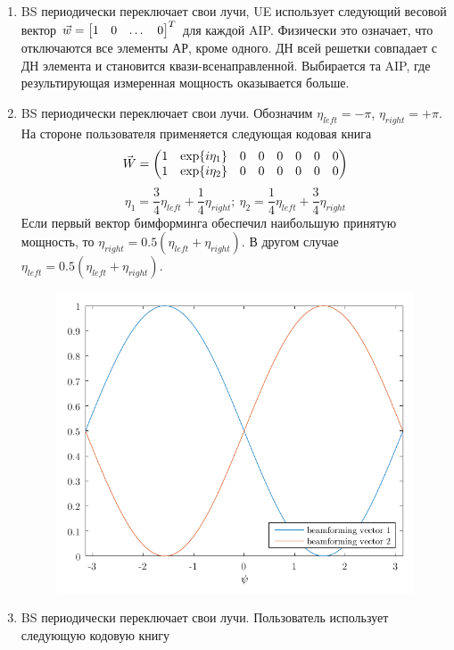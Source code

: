 \begin{enumerate}[label=\textbf{Шаг \arabic*:}]
    \item BS периодически переключает свои лучи, UE использует следующий весовой вектор $\vec w = \mqty*[1 & 0 & \dots & 0]^T$ для каждой AIP. 
    Физически это означает, что отключаются все элементы АР, кроме одного. ДН всей решетки совпадает с ДН элемента и становится квази-всенаправленной. 
    Выбирается та AIP, где результирующая измеренная мощность оказывается больше. 
    \item BS периодически переключает свои лучи. Обозначим $\eta_{left} = - \pi$, $\eta_{right} = + \pi$. 
    На стороне пользователя применяется следующая кодовая книга 
    \begin{equation}
        \vec W = 
        \begin{pmatrix}
        \mqty{ 1 & \exp{i\eta_1}} & \zmat{1}{6}\\
        \mqty{ 1 & \exp{i\eta_2}} & \zmat{1}{6}\\
        \end{pmatrix}
    \end{equation}
    \begin{equation}
        \eta_1 = \frac34 \eta_{left} + \frac14 \eta_{right}; ~ \eta_2 = \frac14 \eta_{left} + \frac34 \eta_{right}
    \end{equation}
    Если первый вектор бимформинга обеспечил наибольшую принятую мощность, то 
    $\eta_{right} = 0.5 (\eta_{left} + \eta_{right})$. 
    В другом случае 
    $\eta_{left} = 0.5 (\eta_{left} + \eta_{right})$.
    \begin{figure}[h!]
        \centering
        \includegraphics[width=0.5\linewidth]{figs/fig4.20}
        \caption{}
        \label{fig:4.20}
    \end{figure}
    \item BS периодически переключает свои лучи. Пользователь использует следующую кодовую книгу
    \begin{equation}

\end{equation}
\end{enumerate}
